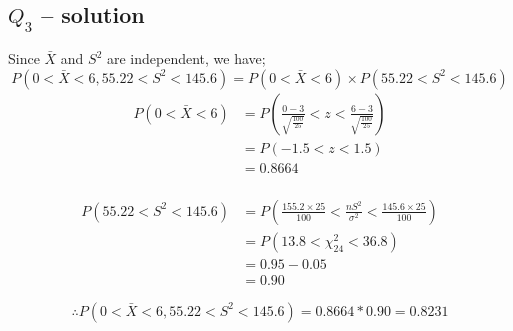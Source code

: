 \documentclass[12pt,a4paper, fleq]{article}
\begin{document}
\subsection*{$Q_{3}$ -- solution}
Since $\bar{X}$ and $S^2$ are independent, we have;
\begin{equation*}
P(0 < \bar{X} < 6, 55.22 < S^2 < 145.6) = P(0 < \bar{X} < 6) \times P(55.22 < S^2 < 145.6)
\end{equation*}
\begin{equation*}
\begin{split}
P(0 < \bar{X} < 6) & = P\left(\frac{0 - 3}{\sqrt{\frac{100}{25}}} < z < \frac{6 - 3}{\sqrt{\frac{100}{25}}}\right)\\
&= P(-1.5 < z < 1.5) \\
&= 0.8664\\
\end{split}
\end{equation*}

\begin{equation*}
\begin{split}
P(55.22 < S^2 < 145.6) & = P\left( \frac{155.2\times 25}{100} <\frac{nS^2}{\sigma^2} < \frac{145.6\times 25}{100}\right)\\
& = P(13.8 < \chi_{24}^2 < 36.8)\\
& = 0.95 - 0.05\\
& = 0.90
\end{split}
\end{equation*}

\begin{equation*}
\therefore P(0 < \bar{X} < 6, 55.22 < S^2 < 145.6) = 0.8664 * 0.90 = \mathbf{0.8231}
\end{equation*}
\end{document}
